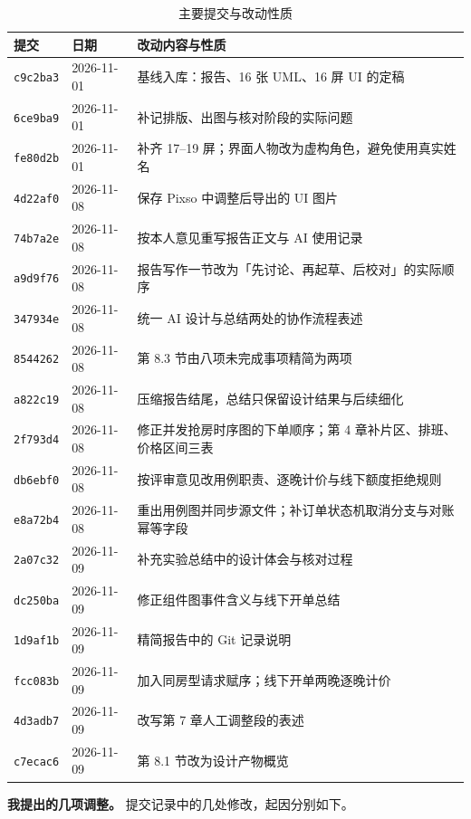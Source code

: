\begin{table}[H]
\centering
\caption{主要提交与改动性质}
\renewcommand{\arraystretch}{1.0}
\begin{tabularx}{\textwidth}{@{}L{1.6cm}L{2.0cm}X@{}}
\toprule
提交 & 日期 & 改动内容与性质 \\
\midrule
\texttt{c9c2ba3} & 2026-11-01 & 基线入库：报告、16 张 UML、16 屏 UI 的定稿 \\
\texttt{6ce9ba9} & 2026-11-01 & 补记排版、出图与核对阶段的实际问题 \\
\texttt{fe80d2b} & 2026-11-01 & 补齐 17--19 屏；界面人物改为虚构角色，避免使用真实姓名 \\
\texttt{4d22af0} & 2026-11-08 & 保存 Pixso 中调整后导出的 UI 图片 \\
\texttt{74b7a2e} & 2026-11-08 & 按本人意见重写报告正文与 AI 使用记录 \\
\texttt{a9d9f76} & 2026-11-08 & 报告写作一节改为「先讨论、再起草、后校对」的实际顺序 \\
\texttt{347934e} & 2026-11-08 & 统一 AI 设计与总结两处的协作流程表述 \\
\texttt{8544262} & 2026-11-08 & 第 8.3 节由八项未完成事项精简为两项 \\
\texttt{a822c19} & 2026-11-08 & 压缩报告结尾，总结只保留设计结果与后续细化 \\
\texttt{2f793d4} & 2026-11-08 & 修正并发抢房时序图的下单顺序；第 4 章补片区、排班、价格区间三表 \\
\texttt{db6ebf0} & 2026-11-08 & 按评审意见改用例职责、逐晚计价与线下额度拒绝规则 \\
\texttt{e8a72b4} & 2026-11-08 & 重出用例图并同步源文件；补订单状态机取消分支与对账幂等字段 \\
\texttt{2a07c32} & 2026-11-09 & 补充实验总结中的设计体会与核对过程 \\
\texttt{dc250ba} & 2026-11-09 & 修正组件图事件含义与线下开单总结 \\
\texttt{1d9af1b} & 2026-11-09 & 精简报告中的 Git 记录说明 \\
\texttt{fcc083b} & 2026-11-09 & 加入同房型请求赋序；线下开单两晚逐晚计价 \\
\texttt{4d3adb7} & 2026-11-09 & 改写第 7 章人工调整段的表述 \\
\texttt{c7ecac6} & 2026-11-09 & 第 8.1 节改为设计产物概览 \\
\bottomrule
\end{tabularx}
\end{table}

\textbf{我提出的几项调整。} 提交记录中的几处修改，起因分别如下。


